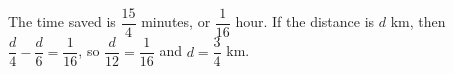 The time saved is $\dfrac{15}{4}$ minutes, or $\dfrac{1}{16}$ hour. If the distance is $d$ km, then $\dfrac{d}{4}-\dfrac{d}{6}=\dfrac{1}{16}$, so $\dfrac{d}{12}=\dfrac{1}{16}$ and $\boxed{d=\dfrac{3}{4}}$ km.
